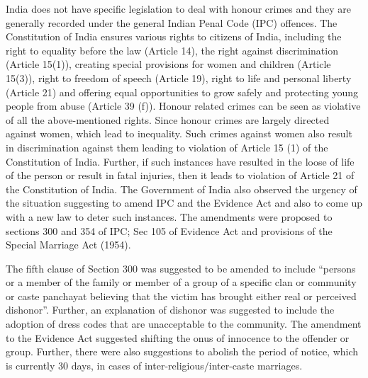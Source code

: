\begin{multicols}{2}

\noi
India does not have specific legislation to deal with honour crimes and they are
generally recorded under the general Indian Penal Code (IPC) offences. The
Constitution of India ensures various rights to citizens of India, including the right to
equality before the law (Article 14), the right against discrimination (Article 15(1)),
creating special provisions for women and children (Article 15(3)), right to freedom of
speech (Article 19), right to life and personal liberty (Article 21) and offering equal
opportunities to grow safely and protecting young people from abuse (Article 39 (f)).
Honour related crimes can be seen as violative of all the above-mentioned rights. Since
honour crimes are largely directed against women, which lead to inequality. Such
crimes against women also result in discrimination against them leading to violation of
Article 15 (1) of the Constitution of India. Further, if such instances have resulted in
the loose of life of the person or result in fatal injuries, then it leads to violation of
Article 21 of the Constitution of India. The Government of India also observed the
urgency of the situation suggesting to amend IPC and the Evidence Act and also to
come up with a new law to deter such instances. The amendments were proposed to
sections 300 and 354 of IPC; Sec 105 of Evidence Act and provisions of the Special
Marriage Act (1954). 

\noi
The fifth clause of Section 300 was suggested to be amended to include “persons or a
member of the family or member of a group of a specific clan or community or caste
panchayat believing that the victim has brought either real or perceived dishonor”.
Further, an explanation of dishonor was suggested to include the adoption of dress codes that are unacceptable to the community. The amendment to the Evidence Act
suggested shifting the onus of innocence to the offender or group. Further, there were
also suggestions to abolish the period of notice, which is currently 30 days, in cases of
inter-religious/inter-caste marriages. 


\end{multicols}
